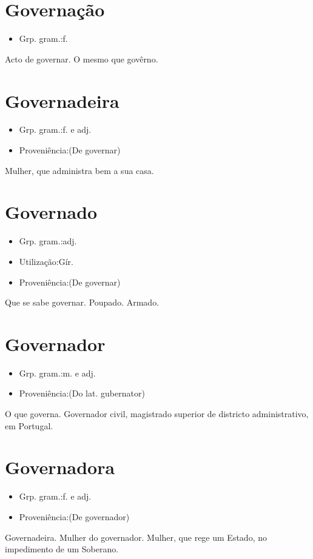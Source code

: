 \section{Governação}
\begin{itemize}
\item {Grp. gram.:f.}
\end{itemize}
Acto de governar.
O mesmo que \textunderscore govêrno\textunderscore .
\section{Governadeira}
\begin{itemize}
\item {Grp. gram.:f.  e  adj.}
\end{itemize}
\begin{itemize}
\item {Proveniência:(De \textunderscore governar\textunderscore )}
\end{itemize}
Mulher, que administra bem a sua casa.
\section{Governado}
\begin{itemize}
\item {Grp. gram.:adj.}
\end{itemize}
\begin{itemize}
\item {Utilização:Gír.}
\end{itemize}
\begin{itemize}
\item {Proveniência:(De \textunderscore governar\textunderscore )}
\end{itemize}
Que se sabe governar.
Poupado.
Armado.
\section{Governador}
\begin{itemize}
\item {Grp. gram.:m.  e  adj.}
\end{itemize}
\begin{itemize}
\item {Proveniência:(Do lat. \textunderscore gubernator\textunderscore )}
\end{itemize}
O que governa.
\textunderscore Governador civil\textunderscore , magistrado superior de districto administrativo, em Portugal.
\section{Governadora}
\begin{itemize}
\item {Grp. gram.:f.  e  adj.}
\end{itemize}
\begin{itemize}
\item {Proveniência:(De \textunderscore governador\textunderscore )}
\end{itemize}
Governadeira.
Mulher do governador.
Mulher, que rege um Estado, no impedimento de um Soberano.
